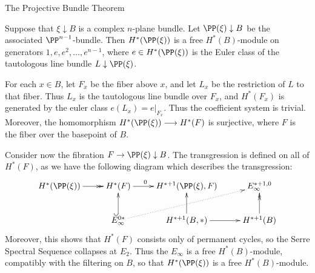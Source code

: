 \documentclass[11pt]{article}
\theoremstyle{plain}
\theoremstyle{definition}
\renewcommand{\to}{\longrightarrow}
\newcommand{\myheading}[1]%
{{\noindent\Large #1}

}
\begin{document}
\myheading{The Projective Bundle Theorem}
Suppose that $\xi\downarrow B$ is a complex $n$-plane bundle. Let $\PP(\xi)\downarrow B$ be the associated $\PP^{n-1}$-bundle. Then $H^*(\PP(\xi))$ is a free $H^*(B)$-module on generators $1,e,e^2,\ldots,e^{n-1}$, where $e\in H^*(\PP(\xi))$ is the Euler class of the tautologous line bundle $L\downarrow \PP(\xi)$.

For each $x\in B$, let $F_x$ be the fiber above $x$, and let $L_x$ be the restriction of $L$ to that fiber. Thus $L_x$ is the tautologous line bundle over $F_x$, and $H^*(F_x)$ is generated by the euler class $e(L_x)=e|_{F_x}$. Thus the coefficient system is trivial. Moreover, the homomorphism $H^*(\PP(\xi))\to H^*(F)$ is surjective, where $F$ is the fiber over the basepoint of $B$.

Consider now the fibration $F \rightarrow\PP(\xi)\downarrow B$. The transgression is defined on all of $H^*(F)$, as we have the following diagram which describes the transgression:
\[\xymatrix{
H^*(\PP(\xi))\ar@{->>}[r]&H^*(F)\ar[r]^{0\ \ \ \ \ }&H^{*+1}(\PP(\xi),F)&E_\infty^{*+1,0}\\
&E_\infty^{0*}\ar@{^{(}->}[u]\ar@{.>}[rur]&H^{*+1}(B,*)\ar[u]\ar[r]&H^{*+1}(B)\ar@{->>}[u]
}\]
Moreover, this shows that $H^*(F)$ consists only of permanent cycles, so the Serre Spectral Sequence collapses at $E_2$. Thus the $E_\infty$ is a free $H^*(B)$-module, compatibly with the filtering on $B$, so that $H^*(\PP(\xi))$ is a free $H^*(B)$-module.

\end{document}
